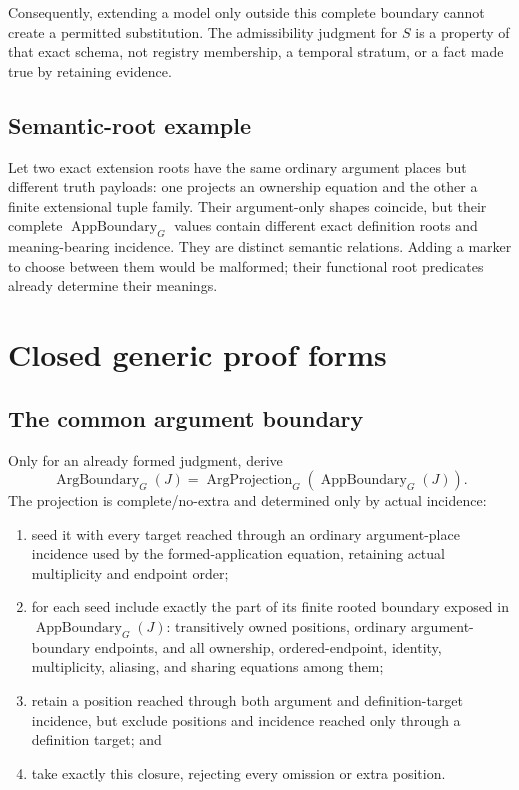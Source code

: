 \documentclass[11pt,twoside]{article}
\begin{document}
Consequently, extending a model only outside this complete boundary cannot create
a permitted substitution.  The admissibility judgment for \(S\) is a property of
that exact schema, not registry membership, a temporal stratum, or a fact made true
by retaining evidence.

\subsection{Semantic-root example}

Let two exact extension roots have the same ordinary argument places but different
truth payloads: one projects an ownership equation and the other a finite
extensional tuple family.  Their argument-only shapes coincide, but their complete
\(\operatorname{AppBoundary}_G\) values contain different exact definition roots
and meaning-bearing incidence.  They are distinct semantic relations.  Adding a
marker to choose between them would be malformed; their functional root predicates
already determine their meanings.

\section{Closed generic proof forms}\label{sec:proof-forms}

\subsection{The common argument boundary}

Only for an already formed judgment, derive
\[
  \operatorname{ArgBoundary}_G(J)
   =\operatorname{ArgProjection}_G
        (\operatorname{AppBoundary}_G(J)).
\]
The projection is complete/no-extra and determined only by actual incidence:

\begin{enumerate}[leftmargin=2.2em]
  \item seed it with every target reached through an ordinary argument-place
        incidence used by the formed-application equation, retaining actual
        multiplicity and endpoint order;
  \item for each seed include exactly the part of its finite rooted boundary
        exposed in \(\operatorname{AppBoundary}_G(J)\): transitively owned
        positions, ordinary argument-boundary endpoints, and all ownership,
        ordered-endpoint, identity, multiplicity, aliasing, and sharing equations
        among them;
  \item retain a position reached through both argument and definition-target
        incidence, but exclude positions and incidence reached only through a
        definition target; and
  \item take exactly this closure, rejecting every omission or extra position.
\end{enumerate}
\end{document}
